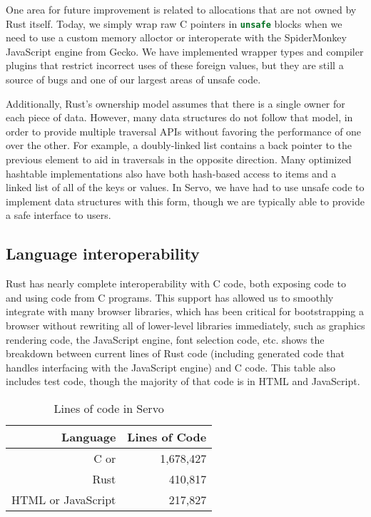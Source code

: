 One area for future improvement is related to allocations that are not owned by Rust itself.
Today, we simply wrap raw C pointers in \lstinline[language=Rust]{unsafe} blocks when we need to use a
custom memory alloctor or interoperate with the SpiderMonkey JavaScript engine from Gecko.
We have implemented wrapper types and compiler plugins that restrict incorrect uses of these foreign values,
but they are still a source of bugs and one of our largest areas of unsafe code.

Additionally, Rust's ownership model assumes that there is a single owner for each piece of data.
However, many data structures do not follow that model, in order to provide multiple traversal
APIs without favoring the performance of one over the other.
For example, a doubly-linked list contains a back pointer to the previous element to aid
in traversals in the opposite direction.
Many optimized hashtable implementations also have both hash-based access to items
and a linked list of all of the keys or values.
In Servo, we have had to use unsafe code to implement data structures with this form,
though we are typically able to provide a safe interface to users.

\subsection{Language interoperability}
Rust has nearly complete interoperability with C code, both exposing code to and using code from
C programs.
This support has allowed us to smoothly integrate with many browser libraries, which has been
critical for bootstrapping a browser without rewriting all of lower-level libraries immediately, such as
graphics rendering code, the JavaScript engine, font selection code, etc.
 shows the breakdown between current lines of Rust code (including generated code that
handles interfacing with the JavaScript engine) and C code.
This table also includes test code, though the majority of that code is in HTML and JavaScript.
\begin{table}
  \begin{center}
    \begin{tabular}{r || r}
      Language & Lines of Code \\
      \hline
      C or \Cplusplus{} & 1,678,427 \\
      Rust & 410,817 \\
      HTML or JavaScript & 217,827 \\
    \end{tabular}%
  \end{center}%
  \caption{Lines of code in Servo}
  \label{servo-loc}
\end{table}

